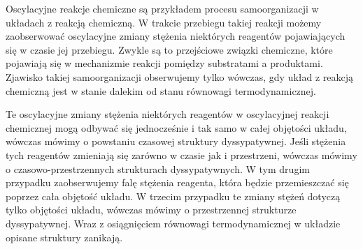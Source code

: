 \documentclass[10pt, a4paper, twoside, onecolumn]{article}
\numberwithin{equation}{section}
\begin{document}
	Oscylacyjne reakcje chemiczne są przykładem procesu samoorganizacji w układach z reakcją chemiczną. W trakcie przebiegu takiej reakcji możemy zaobserwować oscylacyjne zmiany stężenia niektórych reagentów pojawiających się w czasie jej przebiegu. Zwykle są to przejściowe związki chemiczne, które pojawiają się w mechanizmie reakcji pomiędzy substratami a produktami. Zjawisko takiej samoorganizacji obserwujemy tylko wówczas, gdy układ z reakcją chemiczną jest w stanie dalekim od stanu równowagi termodynamicznej. \par
	Te oscylacyjne zmiany stężenia niektórych reagentów w oscylacyjnej reakcji chemicznej mogą odbywać się jednocześnie i tak samo w całej objętości układu, wówczas mówimy o powstaniu czasowej struktury dyssypatywnej. Jeśli stężenia tych reagentów zmieniają się zarówno w czasie jak i przestrzeni, wówczas mówimy o czasowo-przestrzennych strukturach dyssypatywnych. W tym drugim przypadku zaobserwujemy falę stężenia reagenta, która będzie przemieszczać się poprzez cała objętość układu. W trzecim przypadku te zmiany stężeń dotyczą tylko objętości układu, wówczas mówimy o przestrzennej strukturze dyssypatywnej. Wraz z osiągnięciem równowagi termodynamicznej w układzie opisane struktury zanikają. 
	
	
\end{document}
